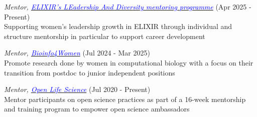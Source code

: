 \documentclass[margin,line]{res}
\begin{document}
\begin{resume}
{\em Mentor, \href{https://elixir-europe.org/internal-projects/elead2/}{\textcolor{blue}{ELIXIR’s LEadership And Diversity mentoring programme}}} (Apr 2025 - Present)\\
Supporting women's leadership growth in ELIXIR through individual and structure mentorship in particular to support career development

{\em Mentor, \href{https://bioinfo4women.bsc.es/}{\textcolor{blue}{Bioinfo4Women}}} (Jul 2024 - Mar 2025)\\
Promote research done by women in computational biology with a focus on their transition from postdoc to junior independent positions


{\em Mentor, \href{https://openlifesci.org/}{\textcolor{blue}{Open Life Science}}} (Jul 2020 - Present)\\
Mentor participants on open science practices as part of a 16-week mentorship and training program to empower open science ambassadors







\end{resume}
\end{document}
